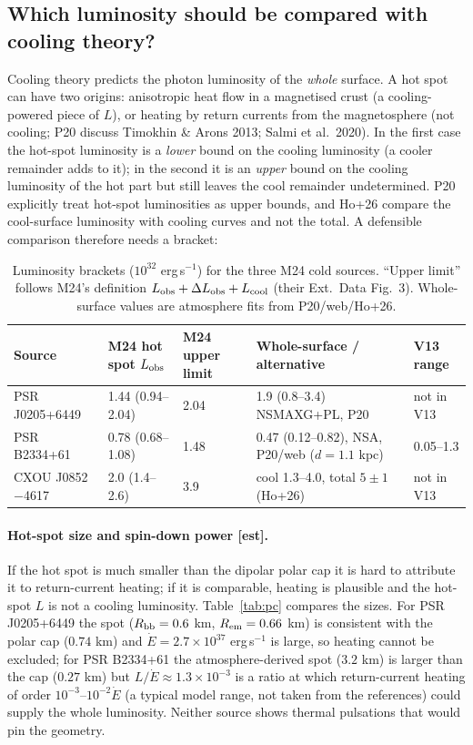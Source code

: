 \documentclass[11pt,a4paper]{article}
\newcommand{\src}[1]{\textsf{[#1]}}
\begin{document}
\subsection{Which luminosity should be compared with cooling theory?}\label{sec:whichL}
Cooling theory predicts the photon luminosity of the \emph{whole} surface. A hot spot can have two origins: anisotropic heat flow in a magnetised crust (a cooling-powered piece of $L$), or heating by return currents from the magnetosphere (not cooling; P20 discuss Timokhin \& Arons 2013; Salmi et al.\ 2020). In the first case the hot-spot luminosity is a \emph{lower} bound on the cooling luminosity (a cooler remainder adds to it); in the second it is an \emph{upper} bound on the cooling luminosity of the hot part but still leaves the cool remainder undetermined. P20 explicitly treat hot-spot luminosities as upper bounds, and Ho+26 compare the cool-surface luminosity with cooling curves and not the total. A defensible comparison therefore needs a bracket:
\begin{table}[htbp]
\centering\small
\caption{Luminosity brackets ($10^{32}$ erg\,s$^{-1}$) for the three M24 cold sources. ``Upper limit'' follows M24's definition $L_{\rm obs}+\Delta L_{\rm obs}+L_{\rm cool}$ (their Ext.\ Data Fig.~3). Whole-surface values are atmosphere fits from P20/web/Ho+26.}\label{tab:bracket}
\begin{adjustbox}{max width=\textwidth}\begin{tabular}{P{3.0cm}P{2.6cm}P{2.2cm}P{4.0cm}P{3.0cm}}
\toprule
Source & M24 hot spot $L_{\rm obs}$ & M24 upper limit & Whole-surface / alternative & V13 range \\
\midrule
PSR J0205+6449 & 1.44 (0.94--2.04) & 2.04 & 1.9 (0.8--3.4) NSMAXG+PL, P20 & not in V13 \\
PSR B2334+61 & 0.78 (0.68--1.08) & 1.48 & 0.47 (0.12--0.82), NSA, P20/web ($d=1.1$ kpc) & 0.05--1.3 \\
CXOU J0852$-$4617 & 2.0 (1.4--2.6) & 3.9 & cool 1.3--4.0, total $5\pm1$ (Ho+26) & not in V13 \\
\bottomrule
\end{tabular}\end{adjustbox}
\end{table}

\paragraph{Hot-spot size and spin-down power \src{est}.} If the hot spot is much smaller than the dipolar polar cap it is hard to attribute it to return-current heating; if it is comparable, heating is plausible and the hot-spot $L$ is not a cooling luminosity. Table~\ref{tab:pc} compares the sizes. For PSR J0205+6449 the spot ($R_{\rm bb}=0.6$ km, $R_{\rm em}=0.66$ km) is consistent with the polar cap ($0.74$ km) and $\dot E=2.7\times10^{37}$ erg\,s$^{-1}$ is large, so heating cannot be excluded; for PSR B2334+61 the atmosphere-derived spot ($3.2$ km) is larger than the cap ($0.27$ km) but $L/\dot E\approx1.3\times10^{-3}$ is a ratio at which return-current heating of order $10^{-3}$--$10^{-2}\dot E$ (a typical model range, not taken from the references) could supply the whole luminosity. Neither source shows thermal pulsations that would pin the geometry.
\end{document}

